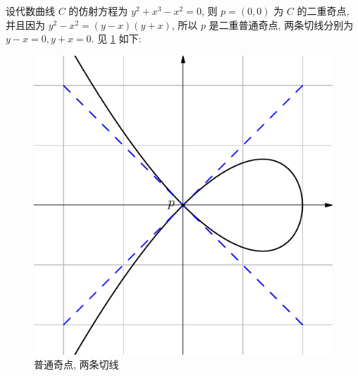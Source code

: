\begin{exmp}[普通奇点]
\label{exmp:ordinary}
设代数曲线 $C$ 的仿射方程为 $y^2 + x^3 - x^2 = 0$,
则 $p = (0,0)$ 为 $C$ 的二重奇点,
并且因为 $y^2 - x^2 = (y-x)(y+x)$,
所以 $p$ 是二重普通奇点,
两条切线分别为 $y-x=0, y+x=0$.
见 \cref{fig:ordinary} 如下:
\begin{figure}[H]
    \centering
    \includegraphics[scale=0.65]{fig-03.pdf}
    \caption{普通奇点, 两条切线}
    \label{fig:ordinary}
\end{figure}
\end{exmp}

